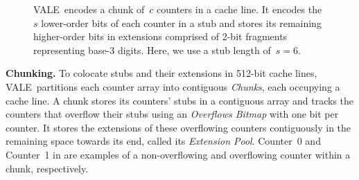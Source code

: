 \documentclass[sigconf]{acmart}
\newcommand{\counterencodingabbrv}{VALE}
\begin{document}
\begin{figure}
    \vspace{-2.3mm}
    \caption{\counterencodingabbrv\ encodes a chunk of~$c$ counters in a cache
    line. It encodes the~$s$ lower-order bits of each counter in a stub and
    stores its remaining higher-order bits in extensions comprised of 2-bit
    fragments representing base-3 digits. Here, we use a stub length of~$s=6$.}
    \label{fig:counter_chunk}
    \vspace{-5mm}
\end{figure}

\textbf{Chunking.}
To colocate stubs and their extensions in 512-bit cache lines,
\counterencodingabbrv\ partitions each counter array into contiguous
\emph{Chunks}, each occupying a cache line. A chunk stores its counters' stubs
in a contiguous array and tracks the counters that overflow their stubs using
an \emph{Overflows Bitmap} with one bit per counter. It stores the extensions
of these overflowing counters contiguously in the remaining space towards its
end, called its \emph{Extension Pool}. Counter~0 and Counter~1 in
 are examples of a non-overflowing and overflowing
counter within a chunk, respectively.
\end{document}
